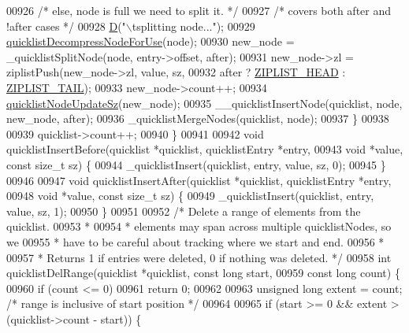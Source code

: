 \begin{DoxyCode}
{{{{{00926         \textcolor{comment}{/* else, node is full we need to split it. */}
00927         \textcolor{comment}{/* covers both after and !after cases */}
00928         \hyperlink{debugmacro_8h_a74021f021dcdfbb22891787b79c5529d}{D}(\textcolor{stringliteral}{"\(\backslash\)tsplitting node..."});
00929         \hyperlink{quicklist_8c_a2f30e6f482d51059f06fa34df69734e1}{quicklistDecompressNodeForUse}(node);
00930         new\_node = \_quicklistSplitNode(node, entry->offset, after);
00931         new\_node->zl = ziplistPush(new\_node->zl, value, sz,
00932                                    after ? \hyperlink{ziplist_8h_a88d32e547c509220e1c50cd9306186ba}{ZIPLIST\_HEAD} : 
      \hyperlink{ziplist_8h_a25d058a2c2c0db0f131f84d23ede6ba2}{ZIPLIST\_TAIL});
00933         new\_node->count++;
00934         \hyperlink{quicklist_8c_a03a3947a9423d234923343702619c553}{quicklistNodeUpdateSz}(new\_node);
00935         \_\_quicklistInsertNode(quicklist, node, new\_node, after);
00936         \_quicklistMergeNodes(quicklist, node);
00937     \}
00938 
00939     quicklist->count++;
00940 \}
00941 
00942 \textcolor{keywordtype}{void} quicklistInsertBefore(quicklist *quicklist, quicklistEntry *entry,
00943                            \textcolor{keywordtype}{void} *value, \textcolor{keyword}{const} size\_t sz) \{
00944     \_quicklistInsert(quicklist, entry, value, sz, 0);
00945 \}
00946 
00947 \textcolor{keywordtype}{void} quicklistInsertAfter(quicklist *quicklist, quicklistEntry *entry,
00948                           \textcolor{keywordtype}{void} *value, \textcolor{keyword}{const} size\_t sz) \{
00949     \_quicklistInsert(quicklist, entry, value, sz, 1);
00950 \}
00951 
00952 \textcolor{comment}{/* Delete a range of elements from the quicklist.}
00953 \textcolor{comment}{ *}
00954 \textcolor{comment}{ * elements may span across multiple quicklistNodes, so we}
00955 \textcolor{comment}{ * have to be careful about tracking where we start and end.}
00956 \textcolor{comment}{ *}
00957 \textcolor{comment}{ * Returns 1 if entries were deleted, 0 if nothing was deleted. */}
00958 \textcolor{keywordtype}{int} quicklistDelRange(quicklist *quicklist, \textcolor{keyword}{const} \textcolor{keywordtype}{long} start,
00959                       \textcolor{keyword}{const} \textcolor{keywordtype}{long} count) \{
00960     \textcolor{keywordflow}{if} (count <= 0)
00961         \textcolor{keywordflow}{return} 0;
00962 
00963     \textcolor{keywordtype}{unsigned} \textcolor{keywordtype}{long} extent = count; \textcolor{comment}{/* range is inclusive of start position */}
00964 
00965     \textcolor{keywordflow}{if} (start >= 0 && extent > (quicklist->count - start)) \{
}}}}}
\end{DoxyCode}
